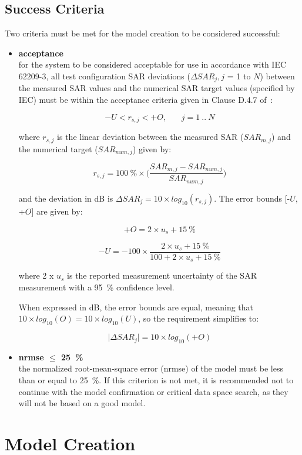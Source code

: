 \documentclass{article}
\begin{document}
\subsection{Success Criteria}\label{sec:quantities}

Two criteria must be met for the model creation to be considered successful:

\begin{itemize}
\item \textbf{acceptance}\\ for the system to be considered acceptable for use in accordance with IEC 62209-3, all test configuration SAR deviations ($\Delta SAR_j, j$ = 1 to $N$) between the measured SAR values and the numerical SAR target values (specified by IEC) must be within the acceptance criteria given in Clause D.4.7 of~\cite{standard}:

\[
-U < r_{s,j} < +O, ~~~~~~~~ j = 1~..~N
\]

where $r_{s,j}$ is the linear deviation between the measured SAR ($SAR_{m,j}$) and the numerical target ($SAR_{num,j}$) given by:

\[
r_{s,j} = 100~\% \times \Big(\frac{SAR_{m,j} - SAR_{num,j}}{SAR_{num,j}}\Big)
\]

and the deviation in dB is $\Delta SAR_j = 10 \times log_{10} (r_{s,j})$. The error bounds [-$U$, +$O$] are given by:

\[
+O = 2 \times u_s + 15~\%
\]

\[
-U = -100 \times \frac{2 \times u_s + 15~\%}{100 + 2 \times u_s + 15~\%}
\]

where 2 x $u_s$ is the reported measurement uncertainty of the SAR measurement with a 95~\% confidence level.

When expressed in dB, the error bounds are equal, meaning that $10 \times log_{10}(O) = 10 \times log_{10}(U)$, so the requirement simplifies to:

\[
\big|\Delta SAR_j\big| = 10 \times log_{10}(+O)
\]

\item \textbf{nrmse $\le$ 25~\%}\\ the normalized root-mean-square error (nrmse) of the model must be less than or equal to 25~\%. If this criterion is not met, it is recommended not to continue with the model confirmation or critical data space search, as they will not be based on a good model.
\end{itemize}

\section{Model Creation}
\end{document}
